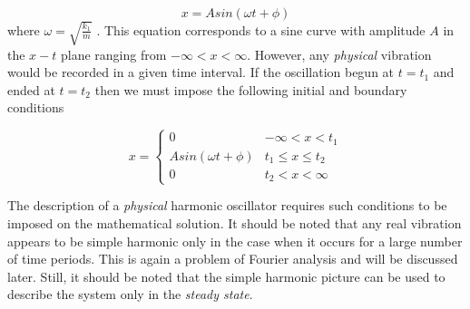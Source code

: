 \documentclass{article}
\newcommand{\f}[2]{\frac{#1}{#2}}
\begin{document}
	$$ x = Asin(\omega t + \phi)$$
	where $ \omega = \sqrt{\f{k_1}{m}}$ .
	This equation corresponds to a sine curve with amplitude $A$ in the $x-t$ plane ranging from $ -\infty < x < \infty $. However, any \textit{physical} vibration would be recorded in a given time interval. If the oscillation begun at $t=t_1$ and ended at $t=t_2$ then we must impose the following initial and boundary conditions
	
	$$ x = \begin{cases}
	0 & -\infty < x < t_1\\
	Asin(\omega t + \phi) & t_1 \leq x \leq t_2\\
	0 & t_2 < x < \infty
	\end{cases}$$

	The description of a \textit{physical} harmonic oscillator requires such conditions to be imposed on the mathematical solution. It should be noted that any real vibration appears to be simple harmonic only in the case when it occurs for a large number of time periods. This is again a problem of Fourier analysis and will be discussed later. Still, it should be noted that the simple harmonic picture can be used to describe the system only in the \textit{steady state}.
\end{document}
